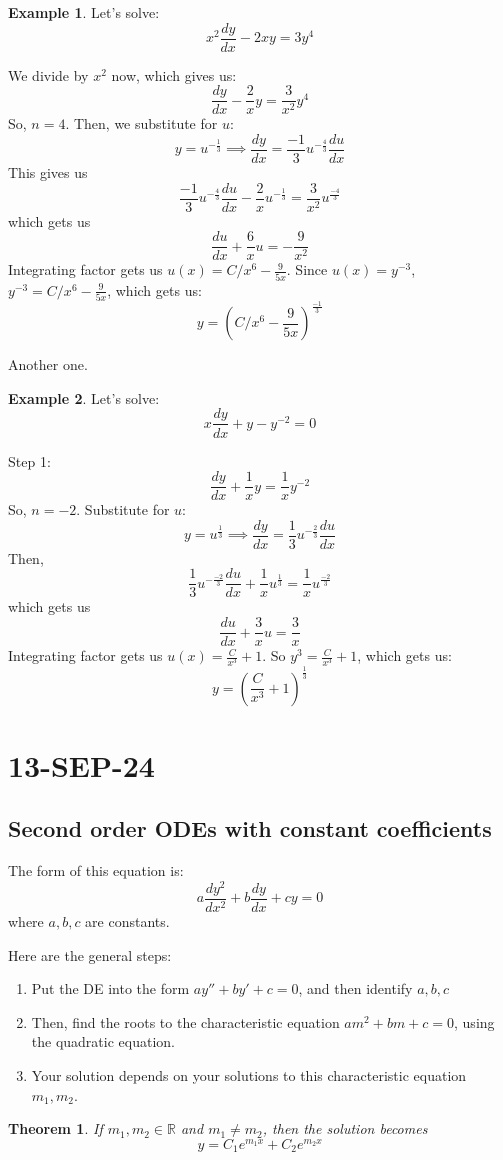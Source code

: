 \documentclass{article}
\newtheorem{thm}{Theorem}
\theoremstyle{definition}
\newtheorem{example}{Example}[section]
\begin{document}
\begin{example}
    Let's solve:
    \[ 
    x^2\frac{dy}{dx} - 2xy = 3y^4
    \]

    We divide by $x^2$ now, which gives us:
    \[
    \frac{dy}{dx} - \frac{2}{x}y = \frac{3}{x^2}y^4
    \]
    So, $n=4$. Then, we substitute for $u$:
    \[ 
    y = u^{-\frac{1}{3}} \implies \frac{dy}{dx} = \frac{-1}{3}u^{-\frac{4}{3}}\frac{du}{dx}
    \]
    This gives us
    \[
    \frac{-1}{3}u^{-\frac{4}{3}}\frac{du}{dx} - \frac{2}{x}u^{-\frac{1}{3}} = \frac{3}{x^2}u^\frac{-4}{3}
    \]
    which gets us
    \[\frac{du}{dx} + \frac{6}{x}u = -\frac{9}{x^2} \]
    Integrating factor gets us $u(x) = C/x^6 - \frac{9}{5x}$. Since $u(x) = y^{-3}$, $y^{-3} = C/x^6 - \frac{9}{5x}$, which gets us:
    \[ 
    y = (C/x^6 - \frac{9}{5x})^{\frac{-1}{3}}
    \]
\end{example}
Another one.

\begin{example}
    Let's solve:
    \[ 
    x\frac{dy}{dx} + y - y^{-2} = 0
    \]

    Step 1:
    \[
    \frac{dy}{dx} + \frac{1}{x}y = \frac{1}{x}y^{-2}
    \]
    So, $n=-2$. Substitute for $u$:
    \[ 
    y = u^{\frac{1}{3}} \implies \frac{dy}{dx} = \frac{1}{3}u^{-\frac{2}{3}}\frac{du}{dx}
    \]
    Then, 
    \[
    \frac{1}{3}u^{-\frac{-2}{3}}\frac{du}{dx} + \frac{1}{x}u^{\frac{1}{3}} = \frac{1}{x}u^{\frac{-2}{3}}
    \]
    which gets us
    \[\frac{du}{dx} + \frac{3}{x}u = \frac{3}{x} \]
    Integrating factor gets us $u(x) = \frac{C}{x^3} + 1$. So $y^{3} = \frac{C}{x^3} + 1$, which gets us:
    \[ 
    y = (\frac{C}{x^3} + 1)^\frac{1}{3}
    \]
\end{example}

\section{13-SEP-24}
\subsection{Second order ODEs with constant coefficients}
The form of this equation is:
\[
a \frac{dy^2}{dx^2} + b \frac{dy}{dx} + cy = 0
\] 
where $a, b, c$ are constants.

Here are the general steps:
\begin{enumerate}
    \item Put the DE into the form $ay'' + by' + c = 0$, and then identify $a, b, c$
    \item Then, find the roots to the characteristic equation $am^2 + bm + c = 0$, using the quadratic equation. 
    \item Your solution depends on your solutions to this characteristic equation $m_1, m_2$.
\end{enumerate}
\begin{thm} \label{real distinct}
If $m_1, m_2 \in \mathbb{R}$ and $m_1 \neq m_2$, then the solution becomes 
\[ 
y = C_1e^{m_1x}+C_2e^{m_2x}
\]
\end{thm}
\end{document}
